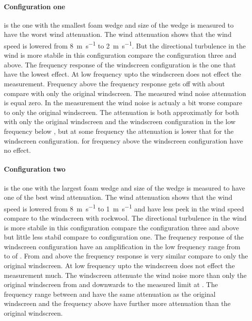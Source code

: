 \paragraph{Configuration one} is the one with the smallest foam wedge and size of the wedge is measured to have the worst wind attenuation. The wind attenuation shows that the wind speed is lowered from \SI{8}{\meter\per\second} to \SI{2}{\meter\per\second}. But the directional turbulence in the wind is more stabile in this configuration compare the configuration three and above. The frequency response of the windscreen configuration is the one that have the lowest effect. At low frequency upto  the windscreen does not effect the measurement. Frequency above the frequency response gets off with about  compare with only the original windscreen. The measured wind noise attenuation is equal zero. In the measurement the wind noise is actualy a bit worse compare to only the original windscreen. The attenuation is both approximatly  for both with only the original windscreen and the windscreen configuration in the low frequency below , but at some frequency the attenuation is lower that  for the windscreen configuration. for frequency above  the windscreen configuration have no effect.

\paragraph{Configuration two} is the one with the largest foam wedge and size of the wedge is measured to have one of the best wind attenuation. The wind attenuation shows that the wind speed is lowered from \SI{8}{\meter\per\second} to \SI{1}{\meter\per\second} and have less peek in the wind speed compare to the windscreen with rockwool. The directional turbulence in the wind is more stabile in this configuration compare the configuration three and above but little less stabil compare to configuration one. The frequency response of the windscreen configuration have an amplification in the low frequency range from  to  of  . From  and above the frequency response is very similar compare to only the original windscreen. At low frequency upto  the windscreen does not effect the measurement much. The windscreen attenuate the wind noise  more than only the original windscreen from  and downwards to the measured limit at . The frequency range between  and  have the same attenuation as the original windscreen and the frequency above have further  more attenuation than the original windscreen.

